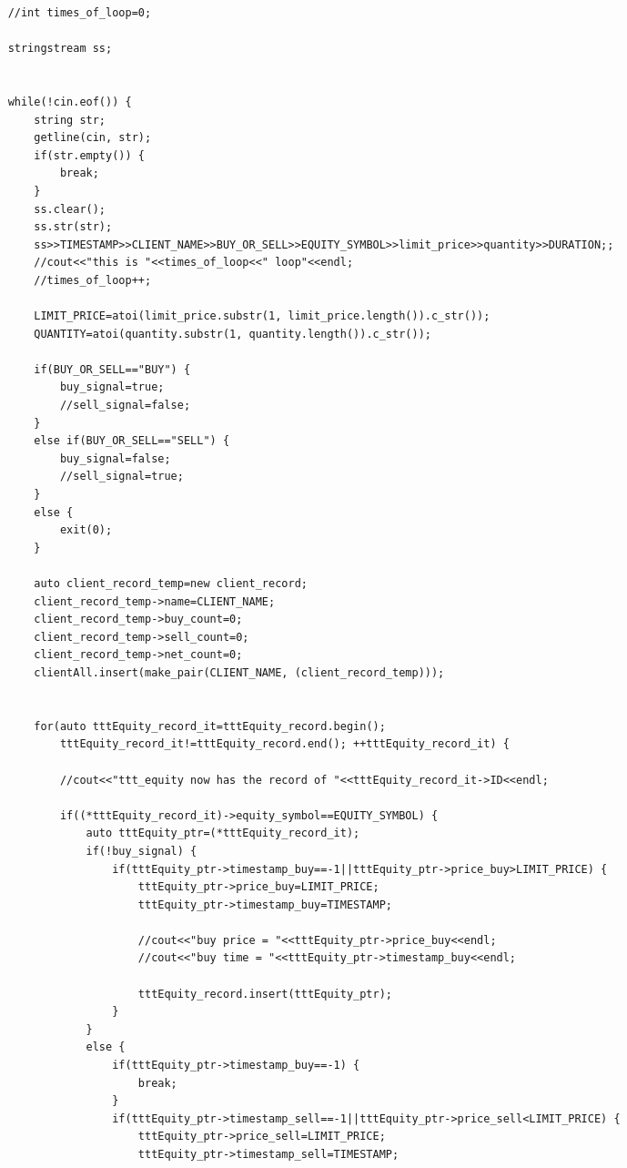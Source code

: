 \documentclass{article}
\begin{document}
\begin{spacing}{1.5}
\begin{lstlisting}
    //int times_of_loop=0;

    stringstream ss;


    while(!cin.eof()) {
        string str;
        getline(cin, str);
        if(str.empty()) {
            break;
        }
        ss.clear();
        ss.str(str);
        ss>>TIMESTAMP>>CLIENT_NAME>>BUY_OR_SELL>>EQUITY_SYMBOL>>limit_price>>quantity>>DURATION;;
        //cout<<"this is "<<times_of_loop<<" loop"<<endl;
        //times_of_loop++;

        LIMIT_PRICE=atoi(limit_price.substr(1, limit_price.length()).c_str());
        QUANTITY=atoi(quantity.substr(1, quantity.length()).c_str());

        if(BUY_OR_SELL=="BUY") {
            buy_signal=true;
            //sell_signal=false;
        }
        else if(BUY_OR_SELL=="SELL") {
            buy_signal=false;
            //sell_signal=true;
        }
        else {
            exit(0);
        }

        auto client_record_temp=new client_record;
        client_record_temp->name=CLIENT_NAME;
        client_record_temp->buy_count=0;
        client_record_temp->sell_count=0;
        client_record_temp->net_count=0;
        clientAll.insert(make_pair(CLIENT_NAME, (client_record_temp)));


        for(auto tttEquity_record_it=tttEquity_record.begin();
            tttEquity_record_it!=tttEquity_record.end(); ++tttEquity_record_it) {

            //cout<<"ttt_equity now has the record of "<<tttEquity_record_it->ID<<endl;

            if((*tttEquity_record_it)->equity_symbol==EQUITY_SYMBOL) {
                auto tttEquity_ptr=(*tttEquity_record_it);
                if(!buy_signal) {
                    if(tttEquity_ptr->timestamp_buy==-1||tttEquity_ptr->price_buy>LIMIT_PRICE) {
                        tttEquity_ptr->price_buy=LIMIT_PRICE;
                        tttEquity_ptr->timestamp_buy=TIMESTAMP;

                        //cout<<"buy price = "<<tttEquity_ptr->price_buy<<endl;
                        //cout<<"buy time = "<<tttEquity_ptr->timestamp_buy<<endl;

                        tttEquity_record.insert(tttEquity_ptr);
                    }
                }
                else {
                    if(tttEquity_ptr->timestamp_buy==-1) {
                        break;
                    }
                    if(tttEquity_ptr->timestamp_sell==-1||tttEquity_ptr->price_sell<LIMIT_PRICE) {
                        tttEquity_ptr->price_sell=LIMIT_PRICE;
                        tttEquity_ptr->timestamp_sell=TIMESTAMP;


\end{lstlisting}
\end{spacing}
\end{document}
